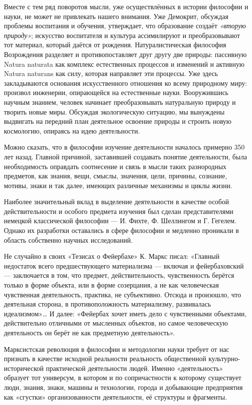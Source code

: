 \documentclass[11pt,a4paper]{article}
\begin{document}
Вместе с тем ряд поворотов мысли, уже осуществлённых в истории философии и
науки, не может не привлекать нашего внимания. Уже Демокрит, обсуждая проблемы
воспитания и обучения, утверждает, что образование создаёт \emph{«вторую
  природу»}; искусство воспитателя и культура ассимилируют и преобразовывают
тот материал, который даётся от рождения. Натуралистическая философия
Возрождения разделяет и противопоставляет друг другу две природы: пассивную
Natura naturata как комплекс естественных процессов и изменений и активную
Natura naturans как силу, которая направляет эти процессы. Уже здесь
закладываются основания искусственного отношения ко всему природному миру:
произвол инженерии, опирающейся на естественные науки. Вооружившись научным
знанием, человек начинает преобразовывать натуральную природу и творить новые
миры. Обсуждая экологическую ситуацию, мы вынуждены выдвигать на передний план
деятельное освоение природы и строить новую космологию, опираясь на идею
деятельности.

Можно сказать, что в философии изучение деятельности началось примерно 350 лет
назад. Главной причиной, заставившей создавать понятие деятельности, была
необходимость оправдать соотнесение и связь в мысли таких разнородных
предметов, как знания, вещи, смыслы, значения, цели, причины, сознание,
мотивы, знаки и так далее, имеющих различные механизмы и циклы жизни. 

Наиболее значительный вклад в выделение деятельности в качестве особой
действительности и особого предмета изучения был сделан представителями
немецкой классической философии — И. Фихте, Ф. Шеллингом и Г. Гегелем. Однако
их разработки оставались в сфере философии и медленно проникали в область
собственно научных исследований. 

Не случайно в своих «Тезисах о Фейербахе» К. Маркс писал: «Главный недостаток
всего предшествующего материализма — включая и фейербаховский — заключается в
том, что предмет, действительность, чувственность берётся только в форме
объекта, или в форме созерцания, а не как человеческая чувственная
деятельность, практика, не субъективно. Отсюда и произошло, что деятельная
сторона, в противоположность материализму, развивалась идеализмом»… И далее:
«Фейербах хочет иметь дело с чувственными объектами, действительно отличными
от мысленных объектов, но самое человеческую деятельность он берёт не как
предметную деятельность». 

Марксистская революция в философии и методологии науки требует от нас признать
в качестве исходной реальности реальность общественной культурно-исторической
практической деятельности людей. Именно «деятельность» образует тот универсум,
в котором и по сопричастности к которому существует люди, знания, знаки,
машины и технологии, города и добывающие предприятия как «сгустки»
организованности деятельности, её структуры и фрагменты. 
\end{document}
